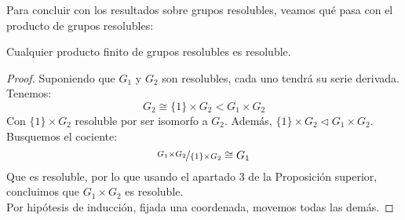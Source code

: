 Para concluir con los resultados sobre grupos resolubles, veamos qué pasa con el producto de grupos resolubles:

\begin{coro}
    Cualquier producto finito de grupos resolubles es resoluble.
    \begin{proof}
        Suponiendo que $G_1$ y $G_2$ son resolubles, cada uno tendrá su serie derivada. Tenemos:
        \begin{equation*}
            G_2 \cong \{1\} \times G_2 < G_1 \times G_2
        \end{equation*}
        Con $\{1\} \times G_2$ resoluble por ser isomorfo a $G_2$. Además, $\{1\}\times G_2 \lhd G_1\times G_2$. Busquemos el cociente:
        \begin{equation*}
            \nicefrac{G_1\times G_2}{\{1\}\times G_2}\cong G_1
        \end{equation*}
        Que es resoluble, por lo que usando el apartado 3 de la Proposición superior, concluimos que $G_1\times G_2$ es resoluble.\\

        Por hipótesis de inducción, fijada una coordenada, movemos todas las demás.
    \end{proof}
\end{coro}
